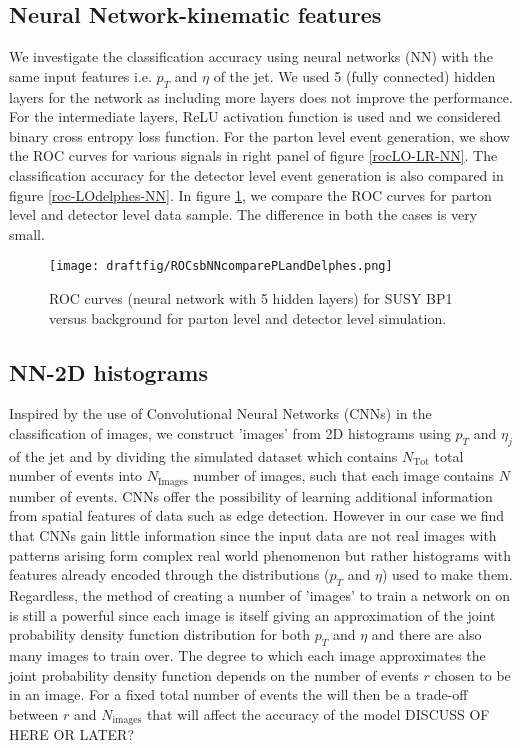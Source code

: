 \documentclass[aps,onecolumn,showpacs,superscriptaddress,groupedaddress,nofootinbib,preprint]{revtex4-1}
\begin{document}
\subsection{Neural Network-kinematic features}
We investigate the classification accuracy using  neural networks (NN) with the same input 
features i.e. $p_T$ and $\eta$ of the jet. We used 5 (fully connected) hidden layers for the  network as including more 
layers does not improve the performance. For the intermediate layers, ReLU activation function is used and we considered binary cross entropy loss function.
For the parton level event generation, we show the ROC curves for various signals in right panel of figure \ref{rocLO-LR-NN}. The classification accuracy for the 
detector level event generation is also compared in figure \ref{roc-LOdelphes-NN}.  In figure \ref{roc-LO-PL-delphes-NN}, we 
compare the ROC curves for parton level and detector level data sample. The difference in both the cases is very small.


\begin{figure} %
\centering
\texttt{[image: draftfig/ROCsbNNcomparePLandDelphes.png]}
\caption{ROC curves (neural network with 5 hidden layers) for SUSY BP1 versus background for parton level and detector level simulation.}\label{roc-LO-PL-delphes-NN}
\end{figure}

\subsection{NN-2D histograms}
Inspired by the use of Convolutional Neural Networks (CNNs) in the classification of images, we construct 'images' from 2D histograms using $p_T$ and $\eta_j$ of the jet and by dividing the simulated dataset which contains $N_\text{Tot}$ total number of events into $N_\text{Images}$ number of images, such that each image contains $N$ number of events. CNNs offer the possibility of learning additional information from spatial features of data such as edge detection. However in our case we find that CNNs gain little information since the input data are not real images with patterns arising form complex real world phenomenon but rather histograms with features already encoded through the distributions ($p_T$ and $\eta$) used to make them. Regardless, the method of creating a number of 'images' to train a network on on is still a powerful since each image is itself giving an approximation of the joint probability density function distribution for both $p_T$ and $\eta$ and there are also many images to train over. The degree to which each image approximates the joint probability density function depends on the number of events $r$ chosen to be in an image. For a fixed total number of events the will then be a trade-off between $r$ and $N_\text{images}$ that will affect the accuracy of the model DISCUSS OF HERE OR LATER? 
\end{document}
